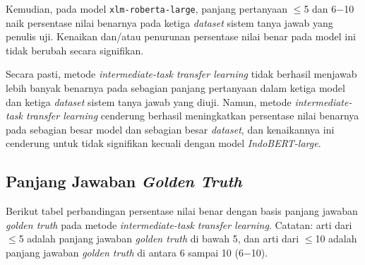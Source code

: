Kemudian, pada model \texttt{xlm-roberta-large}, panjang pertanyaan $\leq$5 dan 6$-$10 naik persentase nilai benarnya pada ketiga \emph{dataset} sistem tanya jawab yang penulis uji. Kenaikan dan/atau penurunan persentase nilai benar pada model ini tidak berubah secara signifikan.

Secara pasti, metode \emph{intermediate-task transfer learning} tidak berhasil menjawab lebih banyak benarnya pada sebagian panjang pertanyaan dalam ketiga model dan ketiga \emph{dataset} sistem tanya jawab yang diuji. Namun, metode \emph{intermediate-task transfer learning} cenderung berhasil meningkatkan persentase nilai benarnya pada sebagian besar model dan sebagian besar \emph{dataset}, dan kenaikannya ini cenderung untuk tidak signifikan kecuali dengan model \emph{IndoBERT-large}.

\subsection{Panjang Jawaban \emph{Golden Truth}}
Berikut tabel perbandingan persentase nilai benar dengan basis panjang jawaban \emph{golden truth} pada metode \emph{intermediate-task transfer learning}. Catatan: arti dari $\leq$5 adalah panjang jawaban \emph{golden truth} di bawah 5, dan arti dari $\leq$10 adalah panjang jawaban \emph{golden truth} di antara 6 sampai 10 (6$-$10).

